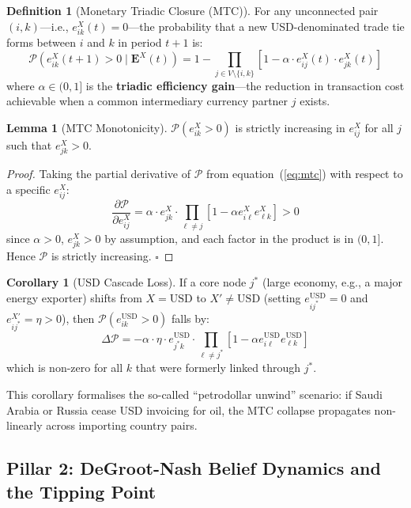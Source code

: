 \documentclass[12pt, letterpaper]{article}
\theoremstyle{definition}
\newtheorem{lemma}{Lemma}
\newtheorem{definition}{Definition}
\newtheorem{corollary}{Corollary}
\begin{document}
\begin{definition}[Monetary Triadic Closure (MTC)]
For any unconnected pair $(i,k)$---i.e., $e_{ik}^X(t) = 0$---the probability that a new USD-denominated trade tie forms between $i$ and $k$ in period $t+1$ is:
\begin{equation}
\mathcal{P}(e_{ik}^X(t{+}1) > 0 \mid \mathbf{E}^X(t)) = 1 - \prod_{j \in V \setminus \{i,k\}} \!\! \left[1 - \alpha \cdot e_{ij}^X(t) \cdot e_{jk}^X(t) \right]
\label{eq:mtc}
\end{equation}
where $\alpha \in (0,1]$ is the \textbf{triadic efficiency gain}---the reduction in transaction cost achievable when a common intermediary currency partner $j$ exists.
\end{definition}

\begin{lemma}[MTC Monotonicity]
\label{lem:mtc}
$\mathcal{P}(e_{ik}^X > 0)$ is strictly increasing in $e_{ij}^X$ for all $j$ such that $e_{jk}^X > 0$.
\end{lemma}

\begin{proof}
Taking the partial derivative of $\mathcal{P}$ from equation~(\ref{eq:mtc}) with respect to a specific $e_{ij}^X$:
\[
\frac{\partial \mathcal{P}}{\partial e_{ij}^X} = \alpha \cdot e_{jk}^X \cdot \prod_{\ell \neq j}\left[1 - \alpha e_{i\ell}^X e_{\ell k}^X \right] > 0
\]
since $\alpha > 0$, $e_{jk}^X > 0$ by assumption, and each factor in the product is in $(0,1]$. Hence $\mathcal{P}$ is strictly increasing. $\square$
\end{proof}

\begin{corollary}[USD Cascade Loss]
If a core node $j^*$ (large economy, e.g., a major energy exporter) shifts from $X = \text{USD}$ to $X' \neq \text{USD}$ (setting $e_{ij^*}^{\text{USD}} = 0$ and $e_{ij^*}^{X'} = \eta > 0$), then $\mathcal{P}(e_{ik}^{\text{USD}} > 0)$ falls by:
\[
\Delta \mathcal{P} = - \alpha \cdot \eta \cdot e_{j^*k}^{\text{USD}} \cdot \prod_{\ell \neq j^*}\left[1 - \alpha e_{i\ell}^{\text{USD}} e_{\ell k}^{\text{USD}}\right]
\]
which is non-zero for all $k$ that were formerly linked through $j^*$.
\end{corollary}

This corollary formalises the so-called ``petrodollar unwind'' scenario: if Saudi Arabia or Russia cease USD invoicing for oil, the MTC collapse propagates non-linearly across importing country pairs.

\subsection{Pillar 2: DeGroot-Nash Belief Dynamics and the Tipping Point}
\end{document}
